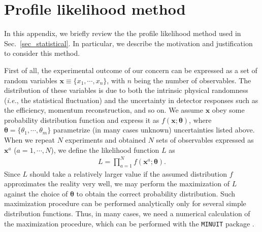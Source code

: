 \documentclass[12pt,twoside,book]{article}
\begin{document}
\section{Profile likelihood method}
\label{sec:profile}

In this appendix, we briefly review the the profile likelihood method used in Sec.~\ref{sec_statistical}.
In particular, we describe the motivation and justification to consider this method.

First of all, the experimental outcome of our concern can be expressed as a set of random variables $\bm{x} \equiv \{ x_1, \cdots, x_n \}$, with $n$ being the number of observables.
The distribution of these variables is due to both the intrinsic physical randomness (\textit{i.e.}, the statistical fluctuation) and the uncertainty in detector responses such as the efficiency, momentum reconstruction, and so on.
We assume $\bm{x}$ obey some probability distribution function and express it as $f(\bm{x} ; \bm{\theta})$, where $\bm{\theta} = \{ \theta_1, \cdots, \theta_m \}$ parametrize (in many cases unknown) uncertainties listed above.
When we repeat $N$ experiments and obtained $N$ sets of observables expressed as $\bm{x}^a$ ($a = 1,\cdots,N$), we define the likelihood function $L$ as
\begin{align}
  L = \prod_{a=1}^N f(\bm{x}^a ; \bm{\theta}).
\end{align}
Since $L$ should take a relatively larger value if the assumed distribution $f$ approximates the reality very well, we may perform the maximization of $L$ against the choice of $\bm{\theta}$ to obtain the correct probability distribution.
Such maximization procedure can be performed analytically only for several simple distribution functions.
Thus, in many cases, we need a numerical calculation of the maximization procedure, which can be performed with the \texttt{MINUIT} package \cite{James:1994vla}.
\end{document}
